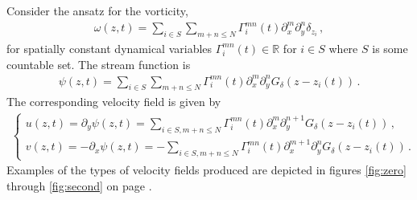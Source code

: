 \documentclass[12pt]{amsart}
\newcommand{\R}{\ensuremath{\mathbb{R}}}
\theoremstyle{remark}
\begin{document}
Consider the ansatz for the vorticity,
\begin{align}
  \omega(z,t) = \sum_{i \in S} \sum_{m+n \leq N} \Gamma^{mn}_i(t) \partial_x^m \partial_y^n \delta_{z_i} \,,
  \label{eq:ansatz N}
\end{align}
for spatially constant dynamical variables $\Gamma^{mn}_i(t) \in \R$ for $i \in S$ where $S$ is some countable set.
The stream function is 
\begin{align*}
  \psi(z,t) = \sum_{i \in S} \sum_{m+n \leq N} \Gamma^{mn}_i(t) \partial_x^m \partial_y^n G_\delta (z-z_i(t) )
\,.\end{align*}
The corresponding velocity field is given by
\begin{align}
\begin{cases}
  u(z,t) = \partial_y \psi(z,t) =  \sum_{i \in S,m+n \leq N} \Gamma^{mn}_i(t) \partial_x^m \partial_y^{n+1} G_\delta (z-z_i(t) )
  \,, \\
  v(z,t) = -\partial_x \psi(z,t) =  - \sum_{i \in S, m+n \leq N} \Gamma^{mn}_i(t) \partial_x^{m+1} \partial_y^n G_\delta (z-z_i(t) )\,.
\end{cases} \label{eq:u N}
\end{align}
Examples of the types of velocity fields produced are depicted in figures \ref{fig:zero} through \ref{fig:second} on page \pageref{fig:zero}.
\end{document}

